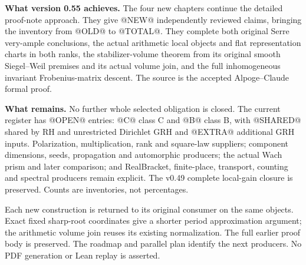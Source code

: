 \textbf{What version 0.55 achieves.}
The four new chapters continue the detailed proof-note approach.
They give @NEW@ independently reviewed claims, bringing the inventory
from @OLD@ to @TOTAL@. They complete both original Serre very-ample
conclusions, the actual arithmetic local objects and flat representation
charts in both ranks, the stabilizer-volume theorem from its original
smooth Siegel--Weil premises and its actual volume join, and the full
inhomogeneous invariant Frobenius-matrix descent.
The source is the accepted Alpoge--Claude formal proof.

\medskip
\textbf{What remains.}
No further whole selected obligation is closed. The current register has
@OPEN@ entries: @C@ class C and @B@ class B, with @SHARED@ shared by
RH and unrestricted Dirichlet GRH and @EXTRA@ additional GRH inputs.
Polarization, multiplication, rank and square-law suppliers; component
dimensions, seeds, propagation and automorphic producers; the actual
Wach prism and later comparison; and RealBracket, finite-place,
transport, counting and spectral producers remain explicit.
The v0.49 complete local-gain closure is preserved.
Counts are inventories, not percentages.

\medskip
Each new construction is returned to its original consumer on the same
objects. Exact fixed sharp-root coordinates give a shorter period
approximation argument; the arithmetic volume join reuses its existing
normalization. The full earlier proof body is preserved. The roadmap
and parallel plan identify the next producers. No PDF generation or
Lean replay is asserted.
